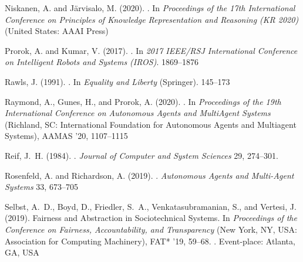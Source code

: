 \documentclass[acmsmall]{custom-arxiv}  %
\begin{document}
\begin{thebibliography}{41}
Niskanen, A. and J{\"{a}}rvisalo, M. (2020).
.
\newblock In \emph{Proceedings of the 17th International Conference on
  Principles of Knowledge Representation and Reasoning (KR 2020)} (United
  States: AAAI Press)

Prorok, A. and Kumar, V. (2017).
.
\newblock In \emph{2017 IEEE/RSJ International Conference on Intelligent Robots
  and Systems (IROS)}. 1869--1876

Rawls, J. (1991).
.
\newblock In \emph{Equality and Liberty} (Springer). 145--173

Raymond, A., Gunes, H., and Prorok, A. (2020).
.
\newblock In \emph{Proceedings of the 19th International Conference on
  Autonomous Agents and MultiAgent Systems} (Richland, SC: International
  Foundation for Autonomous Agents and Multiagent Systems), AAMAS ’20,
  1107--1115

Reif, J.~H. (1984).
.
\newblock \emph{Journal of Computer and System Sciences} 29, 274--301.
\newblock {}

Rosenfeld, A. and Richardson, A. (2019).
.
\newblock \emph{Autonomous Agents and Multi-Agent Systems} 33, 673--705

Selbst, A.~D., Boyd, D., Friedler, S.~A., Venkatasubramanian, S., and Vertesi,
  J. (2019).
\newblock Fairness and {Abstraction} in {Sociotechnical} {Systems}.
\newblock In \emph{Proceedings of the {Conference} on {Fairness},
  {Accountability}, and {Transparency}} (New York, NY, USA: Association for
  Computing Machinery), {FAT}* ’19, 59--68.
\newblock {}.
\newblock Event-place: Atlanta, GA, USA


\end{thebibliography}
\end{document}
